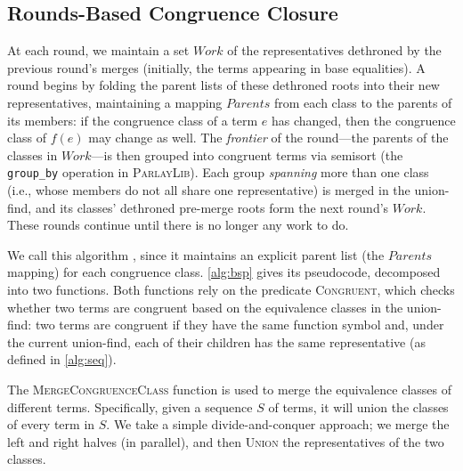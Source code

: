 \subsection{Rounds-Based Congruence Closure}
\label{subsec:rounds}

At each round, we maintain a set $\mathit{Work}$ of the representatives
dethroned by the previous round's merges (initially, the terms appearing in
base equalities). A round begins by folding the parent lists of these
dethroned roots into their new representatives, maintaining a mapping
$\mathit{Parents}$ from each class to the parents of its members:
if the congruence class of a term $e$ has changed, then the congruence class
of $f(e)$ may change as well. The \emph{frontier} of the round---the parents
of the classes in $\mathit{Work}$---is then grouped into congruent terms via
semisort (the \texttt{group\_by} operation in \textsc{ParlayLib}). Each group
\emph{spanning} more than one class (i.e., whose members do not all share one
representative) is merged in the union-find, and its classes' dethroned
pre-merge roots form the next round's $\mathit{Work}$. These rounds continue
until there is no longer any work to do.

We call this algorithm \parentalgo, since it maintains an explicit parent list
(the $\mathit{Parents}$ mapping) for each congruence class.
\autoref{alg:bsp} gives its pseudocode, decomposed into two functions.
Both functions rely on the predicate \textsc{Congruent}, which checks whether
two terms are congruent based on the equivalence classes in the union-find:
two terms are congruent if they have the same function symbol and, under the
current union-find, each of their children has the same representative (as
defined in \autoref{alg:seq}).

The \textsc{MergeCongruenceClass} function is used to merge the equivalence
classes of different terms. Specifically, given a sequence $S$ of terms, it will
union the classes of every term in $S$. We take a simple divide-and-conquer
approach; we merge the left and right halves (in parallel), and then
\textsc{Union} the representatives of the two classes.

